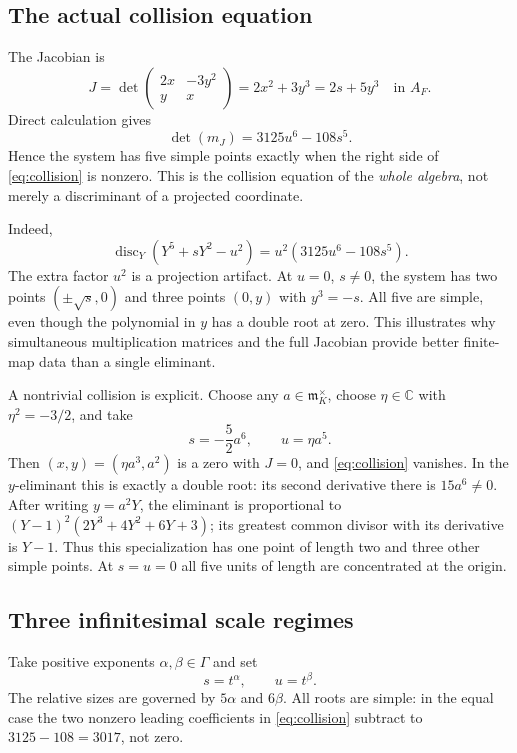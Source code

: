 \documentclass[11pt]{article}
\theoremstyle{definition}
\newcommand{\C}{\mathbb C}
\newcommand{\mm}{\mathfrak m}
\newcommand{\disc}{\operatorname{disc}}
\begin{document}
\subsection{The actual collision equation}
The Jacobian is
\begin{equation}\label{eq:exampleJ}
 J=\det\begin{pmatrix}2x&-3y^2\\y&x\end{pmatrix}
   =2x^2+3y^3=2s+5y^3\quad\text{in }A_F.
\end{equation}
Direct calculation gives
\begin{equation}\label{eq:collision}
 \det(m_J)=3125u^6-108s^5.
\end{equation}
Hence the system has five simple points exactly when the right side of \eqref{eq:collision} is nonzero. This is the collision equation of the \emph{whole algebra}, not merely a discriminant of a projected coordinate.

Indeed,
\begin{equation}\label{eq:projecteddiscriminant}
 \disc_Y(Y^5+sY^2-u^2)=u^2(3125u^6-108s^5).
\end{equation}
The extra factor $u^2$ is a projection artifact. At $u=0$, $s\ne0$, the system has two points $(\pm\sqrt{s},0)$ and three points $(0,y)$ with $y^3=-s$. All five are simple, even though the polynomial in $y$ has a double root at zero. This illustrates why simultaneous multiplication matrices and the full Jacobian provide better finite-map data than a single eliminant.

A nontrivial collision is explicit. Choose any $a\in\mm_K^\times$, choose $\eta\in\C$ with $\eta^2=-3/2$, and take
\[
 s=-\frac52a^6,\qquad u=\eta a^5.
\]
Then $(x,y)=(\eta a^3,a^2)$ is a zero with $J=0$, and \eqref{eq:collision} vanishes. In the $y$-eliminant this is exactly a double root: its second derivative there is $15a^6\ne0$. After writing $y=a^2Y$, the eliminant is proportional to $(Y-1)^2(2Y^3+4Y^2+6Y+3)$; its greatest common divisor with its derivative is $Y-1$. Thus this specialization has one point of length two and three other simple points. At $s=u=0$ all five units of length are concentrated at the origin.

\subsection{Three infinitesimal scale regimes}
Take positive exponents $\alpha,\beta\in\Gamma$ and set
\[
 s=t^\alpha,\qquad u=t^\beta.
\]
The relative sizes are governed by $5\alpha$ and $6\beta$. All roots are simple: in the equal case the two nonzero leading coefficients in \eqref{eq:collision} subtract to $3125-108=3017$, not zero.
\end{document}
